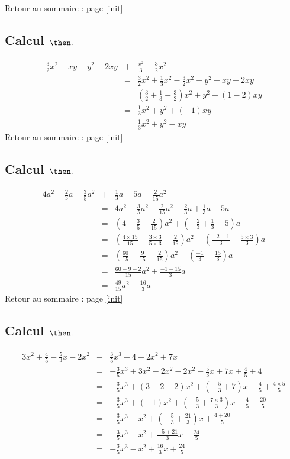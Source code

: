 \documentclass[14pt]{article}
\theoremstyle{remark}
\newcounter{n}
\renewcommand{\it}{Retour au sommaire : page \ref{init}
	\subsection{Calcul $ \mathbf{ \then}.$}\label{\then} \stepcounter{n} }
\theoremstyle{plain}
\begin{document}
\it \begin{eqnarray*}\frac32 x^2+xy+y^2-2xy&+&\frac{x^2}3-\frac32x^2\\
&=& \frac32x^2+\frac13x^2-\frac32x^2+y^2+xy-2xy\\
&=& \left(\frac32+\frac13-\frac32 \right)x^2+y^2+(1-2)xy\\
&=& \frac13x^2+y^2+(-1)xy\\
&=& \frac13x^2+y^2-xy
\end{eqnarray*}
\it \begin{eqnarray*}
4a^2-\frac23a-\frac35a^2&+&\frac13a-5a-\frac2{15}a^2\\
&=&4a^2-\frac35a^2-\frac2{15}a^2-\frac23a+\frac13a-5a\\
&=&\left(4-\frac35-\frac2{15}\right)a^2+\left(-\frac23+\frac13-5\right)a\\
&=& \left(\frac{4\times15}{15}-\frac{3\times3}{5\times3}-\frac2{15}\right)a^2 +\left(\frac{-2+1}3-\frac{5\times3}3\right)a\\
&=& \left(\frac{60}{15}-\frac9{15}-\frac2{15}\right)a^2
+\left(\frac{-1}3-\frac{15}3\right)a\\
&=& \frac{60-9-2}{15}a^2+\frac{-1-15}3a\\
&=& \frac{49}{15}a^2-\frac{16}3a
\end{eqnarray*}
\it \begin{eqnarray*}3x^2+\frac45 - \frac53x - 2x^2 &-&\frac35x^3 + 4 - 2 x^2 + 7x\\
&=& -\frac35x^3+3x^2-2x^2-2x^2-\frac53x+7x+\frac45+4\\
&=& -\frac35x^3+(3-2-2)x^2 +\left(-\frac53+7\right)x+\frac45+\frac{4\times5}5\\
&=& -\frac35x^3 +(-1)x^2 + \left(-\frac53+\frac{7\times3}3\right)x+\frac45+\frac{20}5\\
&=& -\frac35x^3-x^2+\left(-\frac53+\frac{21}3\right)x+\frac{4+20}5\\
&=& -\frac35x^3-x^2+\frac{-5+21}3x+\frac{24}5\\
&=& -\frac35x^3-x^2+\frac{16}3x+\frac{24}5
\end{eqnarray*}
\end{document}
